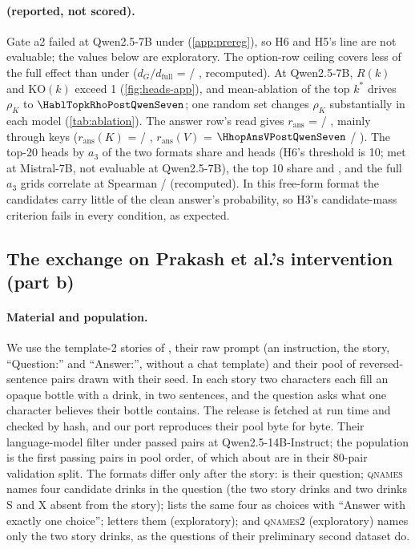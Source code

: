 \paragraph{\fmtPost{} (reported, not scored).} Gate a2 failed at Qwen2.5-7B under \fmtPost{} (\cref{app:prereg}), so H6 and H5's \fmtPost{} line are not evaluable; the values below are exploratory. The option-row ceiling covers less of the full effect than under \fmtOpt{} ($d_G/d_{\mathrm{full}}$ = \HathreeRatioPostQwenSeven{} / \HathreeRatioPostMistralSeven{}, recomputed). At Qwen2.5-7B, $R(k)$ and $\mathrm{KO}(k)$ exceed 1 (\cref{fig:heads-app}), and mean-ablation of the top $k^*$ drives $\rho_K$ to $\HablTopkRhoPostQwenSeven$; one random set changes $\rho_K$ substantially in each model (\cref{tab:ablation}). The answer row's read gives $r_{\mathrm{ans}}$ = \HfivesAnsQwenSeven{} / \HfivesAnsMistralSeven{}, mainly through keys ($r_{\mathrm{ans}}(K)$ = \HhopAnsKPostQwenSeven{} / \HhopAnsKPostMistralSeven{}, $r_{\mathrm{ans}}(V)$ = $\HhopAnsVPostQwenSeven$ / \HhopAnsVPostMistralSeven{}). The top-20 heads by $a_3$ of the two formats share \HsixOverlapQwenSeven{} and \HsixOverlapMistralSeven{} heads (H6's threshold is 10; met at Mistral-7B, not evaluable at Qwen2.5-7B), the top 10 share \HcrossToptenQwenSeven{} and \HcrossToptenMistralSeven{}, and the full $a_3$ grids correlate at Spearman \HcrossRhoQwenSeven{} / \HcrossRhoMistralSeven{} (recomputed). In this free-form format the candidates carry little of the clean answer's probability, so H3's candidate-mass criterion fails in every condition, as expected.

\subsection{The exchange on Prakash et al.'s intervention (part b)}\label{app:prakash}

\paragraph{Material and population.} We use the template-2 stories of \citet{prakash2025lookbacks}, their raw prompt (an instruction, the story, ``Question:'' and ``Answer:'', without a chat template) and their pool of \PkNpool{} reversed-sentence pairs drawn with their seed. In each story two characters each fill an opaque bottle with a drink, in two sentences, and the question asks what one character believes their bottle contains. The release is fetched at run time and checked by hash, and our port reproduces their pool byte for byte. Their language-model filter under \fmtNone{} passed \PkNpass{} pairs at Qwen2.5-14B-Instruct; the population is the first \PkN{} passing pairs in pool order, of which about \PkOverlap{} are in their 80-pair validation split. The formats differ only after the story: \fmtNone{} is their question; \textsc{qnames} names four candidate drinks in the question (the two story drinks and two drinks S and X absent from the story); \fmtOpt{} lists the same four as choices with ``Answer with exactly one choice''; \fmtLetter{} letters them (exploratory); and \textsc{qnames2} (exploratory) names only the two story drinks, as the questions of their preliminary second dataset do.

